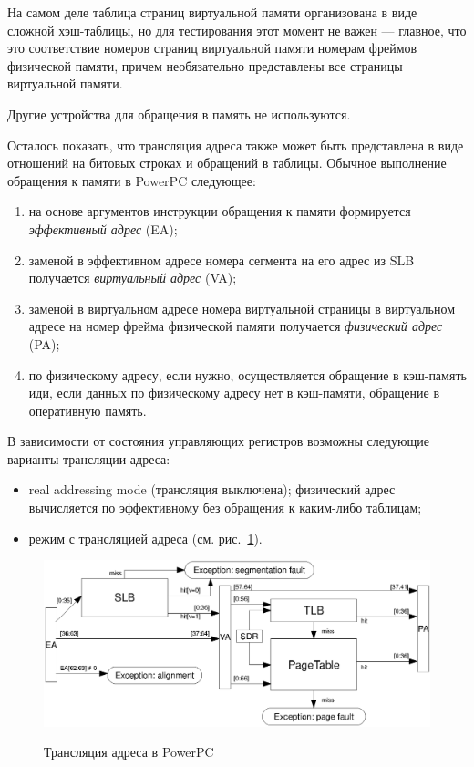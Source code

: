 На самом деле таблица страниц виртуальной памяти организована в виде сложной
хэш-таблицы, но для тестирования этот момент не важен --- главное, что это
соответствие номеров страниц виртуальной памяти номерам фреймов физической
памяти, причем необязательно представлены все страницы виртуальной памяти.

Другие устройства для обращения в память не используются.

Осталось показать, что трансляция адреса также может быть представлена в виде
отношений на битовых строках и обращений в таблицы. Обычное выполнение
обращения к памяти в PowerPC следующее:
\begin{enumerate}
    \item на основе аргументов инструкции обращения к памяти формируется \emph{эффективный
адрес} (EA);
    \item заменой в эффективном адресе номера сегмента на его адрес из SLB получается
\emph{виртуальный адрес} (VA);
    \item заменой в виртуальном адресе номера виртуальной страницы в виртуальном адресе на номер
фрейма физической памяти получается \emph{физический адрес} (PA);
    \item по физическому адресу, если нужно, осуществляется обращение в
кэш-память иди, если данных по физическому адресу нет в кэш-памяти, обращение в
оперативную память.
\end{enumerate}

В зависимости от состояния управляющих регистров возможны следующие варианты
трансляции адреса:
\begin{itemize}
  \item real addressing mode (трансляция выключена); физический адрес
вычисляется по эффективному без обращения к каким-либо таблицам;
  \item режим с трансляцией адреса (см. рис.~\ref{fig:ppc_address_translation}).
\end{itemize}

\begin{figure}[h] \center
  \includegraphics[width=\textwidth]{4.analysis/ppc_addrtrans}\\
  \caption{Трансляция адреса в PowerPC}\label{fig:ppc_address_translation}
\end{figure}


